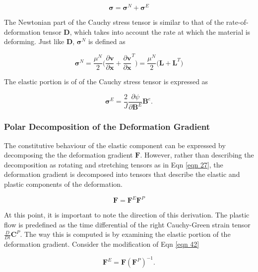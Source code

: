 \documentclass[a4paper]{article}
\begin{document}
\begin{equation}
    \boldsymbol{\sigma} = \boldsymbol{\sigma}^N +  \boldsymbol{\sigma}^E
\end{equation}

 The Newtonian part of the Cauchy stress tensor is similar to that of the rate-of-deformation tensor $\mathbf{D}$, which takes into account the rate at which the material is deforming. Just like $\mathbf{D}$, $\boldsymbol{\sigma}^N$ is defined as
 
\begin{equation}
    \boldsymbol{\sigma}^N = \frac{\mu^N}{2}\biggl(\frac{\partial \mathbf{v}}{\partial \mathbf{x}} + \frac{\partial \mathbf{v}}{\partial \mathbf{x}}^T \biggr) = \frac{\mu^N}{2}\biggl(\mathbf{L} + \mathbf{L}^T \biggr)
\end{equation}
 
The elastic portion is of of the Cauchy stress tensor is expressed as 
 
\begin{equation}
     \boldsymbol{\sigma}^E = \frac{2}{J}\frac{\partial \psi}{\partial \mathbf{B}^E} \mathbf{B}^e. 
\end{equation}

\subsubsection{Polar Decomposition of the Deformation Gradient}
The constitutive behaviour of the elastic component can be expressed by decomposing the the deformation gradient $\mathbf{F}$. However, rather than describing the decomposition as rotating and stretching tensors as in Eqn \ref{eqn 27}, the deformation gradient is decomposed into tensors that describe the elastic and plastic components of the deformation. 

\begin{equation}\label{eqn 42}
    \mathbf{F} = \mathbf{F}^E \mathbf{F}^P
\end{equation}

At this point, it is important to note the direction of this derivation. The plastic flow is predefined as the time differential of the right Cauchy-Green strain tensor $\frac{D}{Dt}\mathbf{C}^P$. The way this is computed is by examining the elastic portion of the deformation gradient. Consider the modification of Eqn \ref{eqn 42}

\begin{equation}\label{eqn 43}
    \mathbf{F}^E = \mathbf{F} (\mathbf{F}^P)^{-1}. 
\end{equation}
\end{document}
